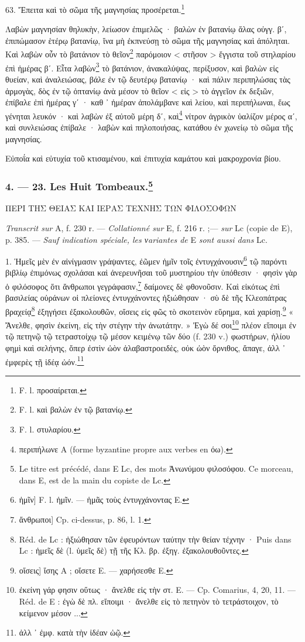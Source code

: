 \documentclass[a4paper, 11pt, oneside, polutonikogreek, french]{article}
\begin{document}
63. Ἔπειτα καὶ τὸ σῶμα τῆς μαγνησίας προσέρεται.\footnote{F. l. προσαίρεται.}

Λαβὼν μαγνησίαν θηλυκὴν, λείωσον ἐπιμελῶς · βαλὼν ἐν βατανίῳ ἅλας οὐγγ. βʹ, ἐπιπώμασον ἑτέρῳ βατανίῳ, ἵνα μὴ ἐκπνεύσῃ τὸ σῶμα τῆς μαγνησίας καὶ ἀπόληται. Καὶ λαβὼν οὖν τὸ βατάνιον τὸ θεῖον\footnote{F. l. καὶ βαλὼν ἐν τῷ βατανίῳ.} παρόμοιον < στῆσον > ἔγγιστα τοῦ στηλαρίου ἐπὶ ἡμέρας βʹ. Εἶτα λαβὼν\footnote{F. l. στυλαρίου.} τὸ βατάνιον, ἀνακαλύψας, περίξυσον, καὶ βαλὼν εἰς θυείαν, καὶ ἀναλειώσας, βάλε ἐν τῷ δευτέρῳ βατανίῳ · καὶ πάλιν περιπηλώσας τὰς ἁρμογὰς, δὸς ἐν τῷ ὀπτανίῳ ἀνὰ μέσον τὸ θεῖον < εἰς > τὸ ἀγγεῖον ἐκ δεξιῶν, ἐπίβαλε ἐπὶ ἡμέρας γʹ · καθ ᾽ ἡμέραν ἀπολάμβανε καὶ λείου, καὶ περιπήλωναι, ἕως γένηται λευκόν · καὶ λαβὼν ἐξ αὐτοῦ μέρη δʹ, καὶ\footnote{περιπήλωνε A (forme byzantine propre aux verbes en όω).} νίτρον ἀγρικὸν ὑαλίζον μέρος αʹ, καὶ συνλειώσας ἐπίβαλε · λαβὼν καὶ πηλοποιήσας, κατάθου ἐν χωνείῳ τὸ σῶμα τῆς μαγνησίας.

Εὐποΐα καὶ εὐτυχία τοῦ κτισαμένου, καὶ ἐπιτυχία καμάτου καὶ μακροχρονία βίου.

\bigskip
\centerline{\EightStarTaper}
\centerline{\EightStarTaper\EightStarTaper}
\bigskip

\subsubsection[4. --- 23. Les Huit Tombeaux.]{4. --- 23. Les Huit Tombeaux.\footnote{Le titre est précédé, dans E Lc, des mots Ἀνωνύμου φιλοσόφου. Ce morceau, dans E, est de la main du copiste de Lc.}}

ΠΕΡΙ ΤΗΣ ΘΕΙΑΣ ΚΑΙ ΙΕΡΑΣ ΤΕΧΝΗΣ ΤΩΝ ΦΙΛΟΣΟΦΩΝ

\emph{Transcrit sur} A, f. 230 r. --- \emph{Collationné sur} E, f. 216 r. ;--- \emph{sur} Lc (copie de E), p. 385. --- \emph{Sauf indication spéciale, les νariantes de} E \emph{sont aussi dans} Lc.

\bigskip

1. Ἡμεῖς μὲν ἐν αἰνίγμασιν γράψαντες, ἐῶμεν ἡμῖν τοῖς ἐντυγχάνουσιν\footnote{ἡμῖν] F. l. ἡμῖν. --- ἡμᾶς τοὺς ἐντυγχάνοντας E.} τῷ παρόντι βιβλίῳ ἐπιμόνως σχολάσαι καὶ ἀνερευνῆσαι τοῦ μυστηρίου τὴν ὑπόθεσιν · φησὶν γὰρ ὁ φιλόσοφος ὅτι ἄνθρωποι γεγράφασιν,\footnote{ἄνθρωποι] Cp. ci-dessus, p. 86, l. 1.} δαίμονες δὲ φθονοῦσιν. Καὶ εἰκότως ἐπὶ βασιλείας οὐράνων οἱ πλείονες ἐντυγχάνοντες ἠξιώθησαν · σὺ δὲ τῆς Κλεοπάτρας βραχείᾳ\footnote{Réd. de Lc : ἠξιώθησαν τῶν ἐφευρόντων ταύτην τὴν θείαν τέχνην · Puis dans Lc : ἡμεῖς δὲ (l. ὑμεῖς δὲ) τῇ τῆς Κλ. βρ. ἐξηγ. ἐξακολουθοῦντες.} ἐξηγήσει ἐξακολουθῶν, οἴσεις εἰς φῶς τὸ σκοτεινὸν εὕρημα, καὶ χαρίσῃ.\footnote{οἴσεις] ἴσης A ; οἴσετε E. --- χαρήσεσθε E.} « Ἄνελθε, φησὶν ἐκείνη, εἰς τὴν στέγην τὴν ἀνωτάτην. » Ἐγὼ δέ σοι\footnote{ἐκείνη γάρ φησιν οὕτως · ἄνελθε εἰς τὴν στ. E. --- Cp. Comarius, 4, 20, 11. --- Réd. de E : ἐγὼ δὲ πλ. εἴποιμι · ἄνελθε εἰς τὸ πετηνὸν τὸ τετράστοιχον, τὸ κείμενον μέσον ...} πλέον εἴποιμι ἐν τῷ πετηνῷ τῷ τετραστοίχῳ τῷ μέσον κειμένῳ τῶν δύο (f. 230 v.) φωστήρων, ἡλίου φημὶ καὶ σελήνης, ὅπερ ἐστὶν ὠὸν ἀλαβαστροειδὲς, οὐκ ὠὸν ὄρνιθος, ἄπαγε, ἀλλ ᾽ ἐμφερὲς τῇ ἰδέᾳ ὠόν.\footnote{ἀλλ ᾽ ἐμφ. κατὰ τὴν ἰδέαν ὠῷ.}
\end{document}
